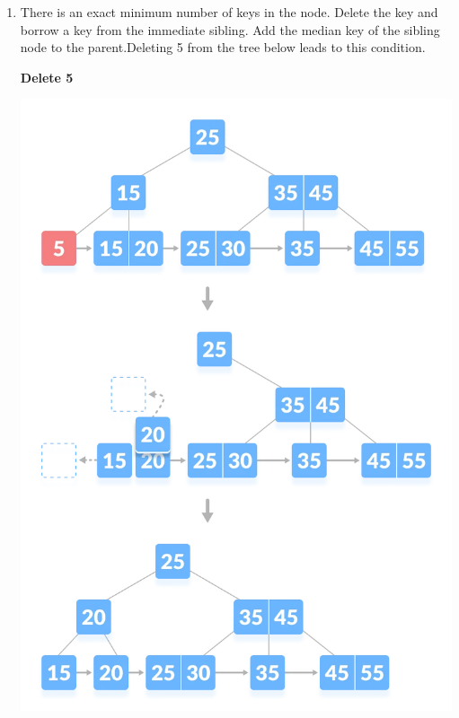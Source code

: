 \documentclass{article}
\begin{document}
\begin{itemize}
\begin{enumerate}
            \item There is an exact minimum number of keys in the node. Delete the key and borrow a key from the immediate sibling. Add the median key of the sibling node to the parent.Deleting 5 from the tree below leads to this condition.\\
            \begin{center}
                 \color{red}\textbf{Delete 5}
            \end{center}
            \centering
            \includegraphics[scale = 0.3]{Images/deletion-2-btree.png}
        \end{enumerate}
    \end{itemize}
    \newpage
\end{document}
